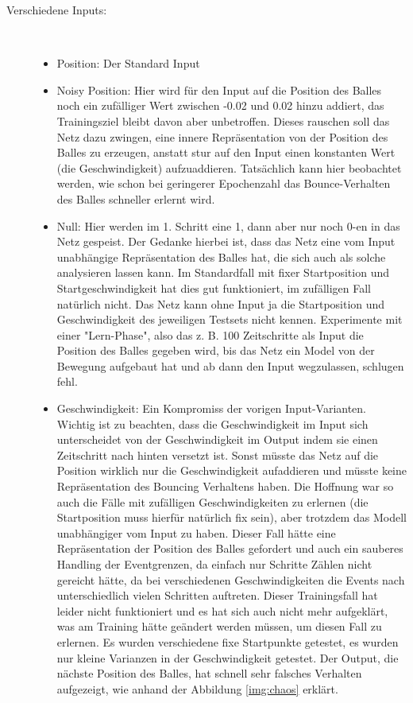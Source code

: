 \begin{description}
	\item[Verschiedene Inputs:] \hfill \\
	\begin{itemize}
		\item Position: Der Standard Input
		\item Noisy Position: Hier wird für den Input auf die Position des Balles noch ein zufälliger Wert zwischen -0.02 und 0.02 hinzu addiert, das Trainingsziel bleibt davon aber unbetroffen. Dieses rauschen soll das Netz dazu zwingen, eine innere Repräsentation von der Position des Balles zu erzeugen, anstatt stur auf den Input einen konstanten Wert (die Geschwindigkeit) aufzuaddieren. Tatsächlich kann hier beobachtet werden, wie schon bei geringerer Epochenzahl das Bounce-Verhalten des Balles schneller erlernt wird.
		\item Null: Hier werden im 1. Schritt eine 1, dann aber nur noch 0-en in das Netz gespeist. Der Gedanke hierbei ist, dass das Netz eine vom Input unabhängige Repräsentation des Balles hat, die sich auch als solche analysieren lassen kann. Im Standardfall mit fixer Startposition und Startgeschwindigkeit hat dies gut funktioniert, im zufälligen Fall natürlich nicht. Das Netz kann ohne Input ja die Startposition und Geschwindigkeit des jeweiligen Testsets nicht kennen. Experimente mit einer "Lern-Phase", also das z. B. 100 Zeitschritte als Input die Position des Balles gegeben wird, bis das Netz ein Model von der Bewegung aufgebaut hat und ab dann den Input wegzulassen, schlugen fehl. 
		\item Geschwindigkeit: Ein Kompromiss der vorigen Input-Varianten. Wichtig ist zu beachten, dass die Geschwindigkeit im Input sich unterscheidet von der Geschwindigkeit im Output indem sie einen Zeitschritt nach hinten versetzt ist. Sonst müsste das Netz auf die Position wirklich nur die Geschwindigkeit aufaddieren und müsste keine Repräsentation des Bouncing Verhaltens haben. Die Hoffnung war so auch die Fälle mit zufälligen Geschwindigkeiten zu erlernen (die Startposition muss hierfür natürlich fix sein), aber trotzdem das Modell unabhängiger vom Input zu haben. Dieser Fall hätte eine Repräsentation der Position des Balles gefordert und auch ein sauberes Handling der Eventgrenzen, da einfach nur Schritte Zählen nicht gereicht hätte, da bei verschiedenen Geschwindigkeiten die Events nach unterschiedlich vielen Schritten auftreten. Dieser Trainingsfall hat leider nicht funktioniert und es hat sich auch nicht mehr aufgeklärt, was am Training hätte geändert werden müssen, um diesen Fall zu erlernen. Es wurden verschiedene fixe Startpunkte getestet, es wurden nur kleine Varianzen in der Geschwindigkeit getestet. Der Output, die nächste Position des Balles, hat schnell sehr falsches Verhalten aufgezeigt, wie anhand der Abbildung \ref{img:chaos} erklärt.
	\end{itemize}


\end{description}
